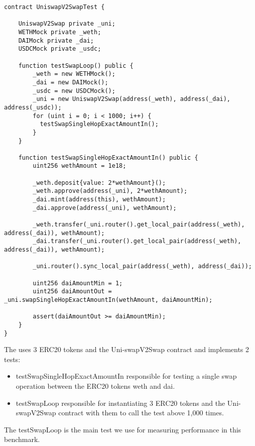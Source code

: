 \documentclass{article}
\theoremstyle{definition}
\newcommand{\code}[1]{{\small \ttfamily #1}}
\begin{document}
\begin{lstlisting}[language=Solidity, label={lst:uniswapV2swap}, caption={UniswapV2SwapTest Solidity Code}, captionpos=b]
contract UniswapV2SwapTest {

    UniswapV2Swap private _uni;
    WETHMock private _weth;
    DAIMock private _dai;
    USDCMock private _usdc;

    function testSwapLoop() public {
        _weth = new WETHMock();
        _dai = new DAIMock();
        _usdc = new USDCMock();
        _uni = new UniswapV2Swap(address(_weth), address(_dai), address(_usdc));
        for (uint i = 0; i < 1000; i++) {
          testSwapSingleHopExactAmountIn();
	    }
    }

    function testSwapSingleHopExactAmountIn() public {
        uint256 wethAmount = 1e18;

        _weth.deposit{value: 2*wethAmount}();
        _weth.approve(address(_uni), 2*wethAmount);
        _dai.mint(address(this), wethAmount);
        _dai.approve(address(_uni), wethAmount);
        
        _weth.transfer(_uni.router().get_local_pair(address(_weth), address(_dai)), wethAmount);
        _dai.transfer(_uni.router().get_local_pair(address(_weth), address(_dai)), wethAmount);

        _uni.router().sync_local_pair(address(_weth), address(_dai));

        uint256 daiAmountMin = 1;
        uint256 daiAmountOut = _uni.swapSingleHopExactAmountIn(wethAmount, daiAmountMin);

        assert(daiAmountOut >= daiAmountMin);
    }
}
\end{lstlisting}

The  uses 3 ERC20 tokens and the Uni-swapV2Swap contract and implements 2 tests: 
\begin{itemize}
    \item \code{testSwapSingleHopExactAmountIn} responsible for testing a single swap operation between the ERC20 tokens \code{weth} and \code{dai}.
    \item \code{testSwapLoop} responsible for instantiating 3 ERC20 tokens and the Uni-swapV2Swap contract with them to call the test above 1,000 times.
\end{itemize}
The \code{testSwapLoop} is the main test we use for measuring performance in this benchmark.
\end{document}
